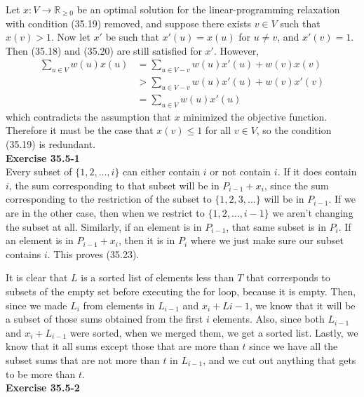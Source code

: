 \documentclass{article}
\begin{document}
Let $x: V \to \mathbb{R}_{\geq 0}$ be an optimal solution for the linear-programming relaxation with condition (35.19) removed, and suppose there exists $v \in V$ such that $x(v) > 1$.  Now let $x'$ be such that $x'(u) = x(u)$ for $u \neq v$, and $x'(v) = 1$.  Then (35.18) and (35.20) are still satisfied for $x'$.  However, 
\begin{align*}
\sum_{u \in V} w(u)x(u) &= \sum_{u \in V-v} w(u)x'(u) + w(v)x(v) \\
&> \sum_{u \in V-v} w(u)x'(u) + w(v)x'(v) \\
&= \sum_{u \in V} w(u) x'(u) 
\end{align*}
which contradicts the assumption that $x$ minimized the objective function.  Therefore it must be the case that $x(v) \leq 1$ for all $v \in V$, so the condition (35.19) is redundant. \\

\noindent\textbf{Exercise 35.5-1}\\

Every subset of $\{1,2,\ldots, i\}$ can either contain $i$ or not contain $i$. If it does contain $i$, the sum corresponding to that subset will be in $P_{i-1} +x_i$, since the sum corresponding to the restriction of the subset to $\{1,2,3,\ldots\}$ will be in $P_{i-1}$. If we are in the other case, then when we restrict to $\{1,2,\ldots, i-1\}$ we aren't changing the subset at all. Similarly, if an element is in $P_{i-1}$, that same subset is in $P_i$. If an element is in $P_{i-1}+x_i$, then it is in $P_i$ where we just make sure our subset contains $i$. This proves (35.23).

It is clear that $L$ is a sorted list of elements less than $T$ that corresponds to subsets of the empty set before executing the for loop, because it is empty. Then, since we made $L_i$ from elements in $L_{i-1}$ and $x_i + L{i-1}$, we know that it will be a subset of those sums obtained from the first $i$ elements. Also, since both $L_{i-1}$ and $x_i + L_{i-1}$ were sorted, when we merged them, we get a sorted list. Lastly, we know that it all sums except those that are more than $t$ since we have all the subset sums that are not more than $t$ in $L_{i-1}$, and we cut out anything that gets to be more than $t$.\\

\noindent\textbf{Exercise 35.5-2}\\
\end{document}
